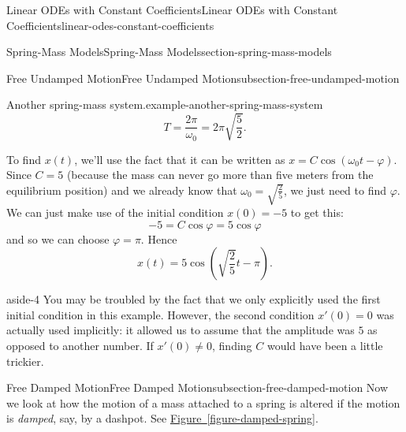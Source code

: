 \documentclass[oneside,10pt,]{book}
\numberwithin{equation}{section}
\begin{document}
\begin{chapterptx}{Linear ODEs with Constant Coefficients}{}{Linear ODEs with Constant Coefficients}{}{}{linear-odes-constant-coefficients}
\begin{sectionptx}{Spring-Mass Models}{}{Spring-Mass Models}{}{}{section-spring-mass-models}
\begin{subsectionptx}{Free Undamped Motion}{}{Free Undamped Motion}{}{}{subsection-free-undamped-motion}
\begin{example}{Another spring-mass system.}{example-another-spring-mass-system}
\begin{equation*}
T = \frac{2\pi}{\omega_{0}} = 2\pi\sqrt{\frac{5}{2}}.
\end{equation*}
%
\par
\hypertarget{p-207}{}%
To find \(x(t)\), we'll use the fact that it can be written as \(x = C\cos(\omega_{0}t-\varphi)\). Since \(C = 5\) (because the mass can never go more than five meters from the equilibrium position) and we already know that \(\omega_{0} = \sqrt{\frac{2}{5}}\), we just need to find \(\varphi\). We can just make use of the initial condition \(x(0) = -5\) to get this:%
\begin{equation*}
-5 = C\cos\varphi = 5\cos\varphi
\end{equation*}
and so we can choose \(\varphi=\pi\). Hence%
\begin{equation*}
x(t) = 5\cos(\sqrt{\frac{2}{5}}t-\pi).
\end{equation*}
%
\end{example}
\begin{aside}{}{aside-4}%
\hypertarget{p-208}{}%
You may be troubled by the fact that we only explicitly used the first initial condition in this example. However, the second condition \(x'(0) = 0\) was actually used implicitly: it allowed us to assume that the amplitude was \(5\) as opposed to another number. If \(x'(0)\neq0\), finding \(C\) would have been a little trickier.%
\end{aside}
\end{subsectionptx}
%
%
\typeout{************************************************}
\typeout{************************************************}
%
\begin{subsectionptx}{Free Damped Motion}{}{Free Damped Motion}{}{}{subsection-free-damped-motion}
\hypertarget{p-209}{}%
Now we look at how the motion of a mass attached to a spring is altered if the motion is \emph{damped}, say, by a dashpot. See \hyperref[figure-damped-spring]{Figure~\ref{figure-damped-spring}}.%
\begin{figure}
\centering
{
}
\end{figure}
\end{subsectionptx}
\end{sectionptx}
\end{chapterptx}
\end{document}
